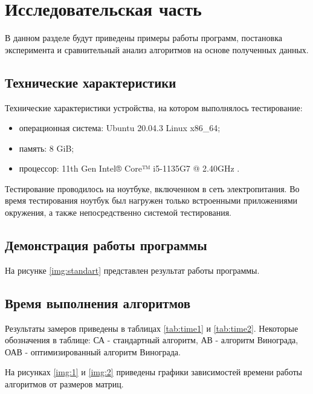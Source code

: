 \chapter{Исследовательская часть}

В данном разделе будут приведены примеры работы программ, постановка эксперимента и сравнительный анализ алгоритмов на основе полученных данных.

\section{Технические характеристики}

Технические характеристики устройства, на котором выполнялось тестирование:

\begin{itemize}
	\item операционная система: Ubuntu 20.04.3 \cite{ubuntu} Linux \cite{linux} x86\_64;
	\item память: 8 GiB;
	\item процессор: 11th Gen Intel® Core™ i5-1135G7 @ 2.40GHz \cite{intel}.
\end{itemize}

Тестирование проводилось на ноутбуке, включенном в сеть электропитания. Во время тестирования ноутбук был нагружен только встроенными приложениями окружения, а также непосредственно системой тестирования.

\section{Демонстрация работы программы}

На рисунке \ref{img:standart} представлен результат работы программы.

\clearpage



\section{Время выполнения алгоритмов}

Результаты замеров приведены в таблицах \ref{tab:time1} и \ref{tab:time2}. Некоторые обозначения в таблице: СА - стандартный алгоритм, АВ - алгоритм Винограда, ОАВ - оптимизированный алгоритм Винограда.

На рисунках \ref{img:1} и \ref{img:2} приведены графики зависимостей времени работы алгоритмов от размеров матриц.


